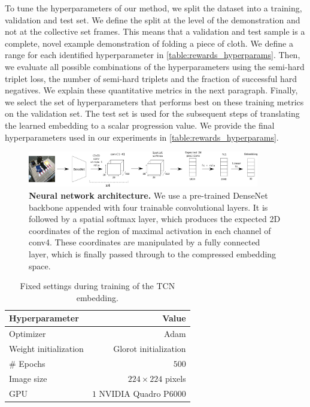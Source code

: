 \documentclass[\home/main.tex]{subfiles}
\begin{document}
To tune the hyperparameters of our method, we split the dataset into a training, validation and test set. We define the split at the level of the demonstration and not at the collective set frames. This means that a validation and test sample is a complete, novel example demonstration of folding a piece of cloth. We define a range for each identified hyperparameter in \cref{table:rewards_hyperparams}. Then, we evaluate all possible combinations of the hyperparameters using the semi-hard triplet loss, the number of semi-hard triplets and the fraction of successful hard negatives. We explain these quantitative metrics in the next paragraph. Finally, we select the set of hyperparameters that performs best on these training metrics on the validation set. The test set is used for the subsequent steps of translating the learned embedding to a scalar progression value. We provide the final hyperparameters used in our experiments in \cref{table:rewards_hyperparams}.

\begin{figure}[htb]
    \centering
    \includegraphics[width=0.90\textwidth, keepaspectratio]{figures/figs_ssr_nn_architecture.png}
    \caption[Neural network architecture for learning time-contrastive embedding.]{
        \textbf{Neural network architecture.} We use a pre-trained DenseNet backbone appended with four trainable convolutional layers. It is followed by a spatial softmax layer, which produces the expected 2D coordinates of the region of maximal activation in each channel of conv4. These coordinates are manipulated by a fully connected layer, which is finally passed through to the compressed embedding space.
    }
    \label{fig:rewards_nn_architecture}
\end{figure}

\begin{table}[htbp]
    \centering
    \caption{Fixed settings during training of the TCN embedding.}
    \begin{tabular}[t]{@{} l r @{}}

        \toprule
        Hyperparameter        & Value                   \\
        \midrule
        Optimizer             & Adam                    \\
        Weight initialization & Glorot initialization   \\
        \# Epochs             & $500$                   \\
        Image size            & $224 \times 224$ pixels \\
        GPU                   & $1$ NVIDIA Quadro P6000 \\
        \bottomrule
    \end{tabular}
    \label{table:rewards_settings}
\end{table}
\end{document}
